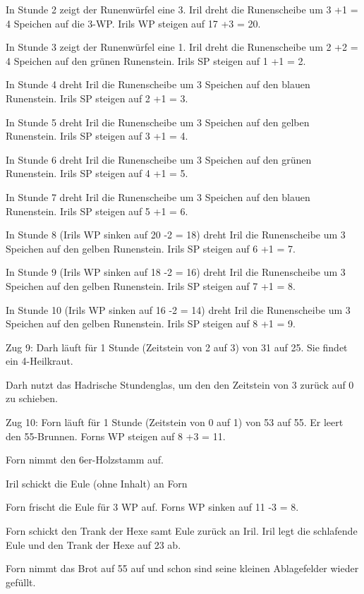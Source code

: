 \documentclass[10pt, a4paper, oneside]{book}
\begin{document}
{In Stunde 2 zeigt der Runenwürfel eine 3. Iril dreht die Runenscheibe um 3 +1 = 4 Speichen auf die 3-WP. Irils WP steigen auf 17 +3 = 20.

In Stunde 3 zeigt der Runenwürfel eine 1. Iril dreht die Runenscheibe um 2 +2 = 4 Speichen auf den grünen Runenstein. Irils SP steigen auf 1 +1 = 2.

In Stunde 4 dreht Iril die Runenscheibe um 3 Speichen auf den blauen Runenstein. Irils SP steigen auf 2 +1 = 3.

In Stunde 5 dreht Iril die Runenscheibe um 3 Speichen auf den gelben Runenstein. Irils SP steigen auf 3 +1 = 4.

In Stunde 6 dreht Iril die Runenscheibe um 3 Speichen auf den grünen Runenstein. Irils SP steigen auf 4 +1 = 5.

In Stunde 7 dreht Iril die Runenscheibe um 3 Speichen auf den blauen Runenstein. Irils SP steigen auf 5 +1 = 6.

In Stunde 8 (Irils WP sinken auf 20 -2 = 18) dreht Iril die Runenscheibe um 3 Speichen auf den gelben Runenstein. Irils SP steigen auf 6 +1 = 7.

In Stunde 9 (Irils WP sinken auf 18 -2 = 16) dreht Iril die Runenscheibe um 3 Speichen auf den gelben Runenstein. Irils SP steigen auf 7 +1 = 8.

In Stunde 10 (Irils WP sinken auf 16 -2 = 14) dreht Iril die Runenscheibe um 3 Speichen auf den gelben Runenstein. Irils SP steigen auf 8 +1 = 9.



Zug 9: Darh läuft für 1 Stunde (Zeitstein von 2 auf 3) von 31 auf 25. Sie findet ein 4-Heilkraut.

Darh nutzt das Hadrische Stundenglas, um den den Zeitstein von 3 zurück auf 0 zu schieben.



Zug 10: Forn läuft für 1 Stunde (Zeitstein von 0 auf 1) von 53 auf 55. Er leert den 55-Brunnen. Forns WP steigen auf 8 +3 = 11.

Forn nimmt den 6er-Holzstamm auf.

Iril schickt die Eule (ohne Inhalt) an Forn

Forn frischt die Eule für 3 WP auf. Forns WP sinken auf 11 -3 = 8.

Forn schickt den Trank der Hexe samt Eule zurück an Iril. Iril legt die schlafende Eule und den Trank der Hexe auf 23 ab.

Forn nimmt das Brot auf 55 auf und schon sind seine kleinen Ablagefelder wieder gefüllt.



}
\end{document}
